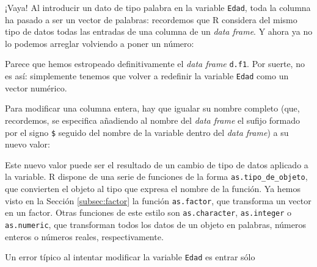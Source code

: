 \documentclass[
]{book}
\newenvironment{Shaded}{\begin{snugshade}}{\end{snugshade}}
\newcommand{\CommentTok}[1]{\textcolor[rgb]{0.56,0.35,0.01}{\textit{#1}}}
\newcommand{\DecValTok}[1]{\textcolor[rgb]{0.00,0.00,0.81}{#1}}
\newcommand{\KeywordTok}[1]{\textcolor[rgb]{0.13,0.29,0.53}{\textbf{#1}}}
\newcommand{\NormalTok}[1]{#1}
\newcommand{\OperatorTok}[1]{\textcolor[rgb]{0.81,0.36,0.00}{\textbf{#1}}}
\theoremstyle{definition}
\theoremstyle{definition}
\theoremstyle{definition}
\theoremstyle{remark}
\begin{document}
¡Vaya! Al introducir un dato de tipo palabra en la variable \texttt{Edad}, toda la columna ha pasado a ser un vector de palabras: recordemos que R considera del mismo tipo de datos todas las entradas de una columna de un \emph{data frame}. Y ahora ya no lo podemos arreglar volviendo a poner un número:

\begin{Shaded}
\end{Shaded}

Parece que hemos estropeado definitivamente el \emph{data frame} \texttt{d.f1}. Por suerte, no es así: simplemente tenemos que volver a redefinir la variable \texttt{Edad} como un vector numérico.

Para modificar una columna entera, hay que igualar su nombre completo (que, recordemos, se especifica añadiendo al nombre del \emph{data frame} el sufijo formado por el signo \texttt{\$} seguido del nombre de la variable dentro del \emph{data frame}) a su nuevo valor:

\begin{Shaded}
\end{Shaded}

Este nuevo valor puede ser el resultado de un cambio de tipo de datos aplicado a la variable. R dispone de una serie de funciones de la forma \texttt{as.tipo\_de\_objeto}, que convierten el objeto al tipo que expresa el nombre de la función. Ya hemos visto en la Sección \ref{subsec:factor} la función \texttt{as.factor}, que transforma un vector en un factor. Otras funciones de este estilo son \texttt{as.character}, \texttt{as.integer} o \texttt{as.numeric}, que transforman todos los datos de un objeto en palabras, números enteros o números reales, respectivamente.

Un error típico al intentar modificar la variable \texttt{Edad} es entrar sólo
\end{document}
